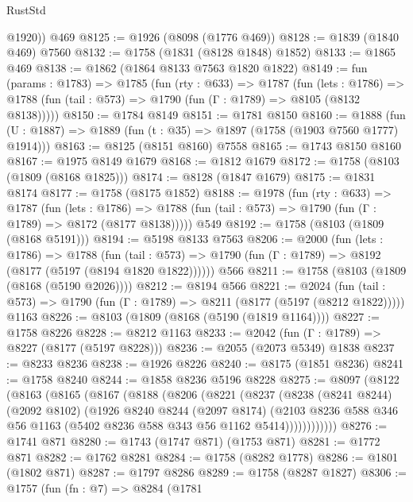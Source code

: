 \begin{lexlean}{RustStd}
\begin{coremodule}
{\begin{coremodule}
{{{{{{{{{{{{{{{        @1920))
    @469
@8125 := @1926 (@8098 (@1776 @469))
@8128 := @1839 (@1840 @469) @7560
@8132 := @1758 (@1831 (@8128 @1848) @1852)
@8133 := @1865 @469
@8138 := @1862 (@1864 @8133 @7563 @1820 @1822)
@8149 := fun (params : @1783) =>
  @1785
    (fun (rty : @633) =>
    @1787
      (fun (lets : @1786) =>
      @1788 (fun (tail : @573) => @1790 (fun (Γ : @1789) => @8105 (@8132 @8138)))))
@8150 := @1784 @8149
@8151 := @1781 @8150
@8160 := @1888 (fun (U : @1887) => @1889 (fun (t : @35) => @1897 (@1758 (@1903 @7560 @1777) @1914)))
@8163 := @8125 (@8151 @8160) @7558
@8165 := @1743 @8150 @8160
@8167 := @1975 @8149 @1679
@8168 := @1812 @1679
@8172 := @1758 (@8103 (@1809 (@8168 @1825)))
@8174 := @8128 (@1847 @1679)
@8175 := @1831 @8174
@8177 := @1758 (@8175 @1852)
@8188 := @1978
    (fun (rty : @633) =>
    @1787
      (fun (lets : @1786) =>
      @1788 (fun (tail : @573) => @1790 (fun (Γ : @1789) => @8172 (@8177 @8138)))))
    @549
@8192 := @1758 (@8103 (@1809 (@8168 @5191)))
@8194 := @5198 @8133 @7563
@8206 := @2000
    (fun (lets : @1786) =>
    @1788
      (fun (tail : @573) => @1790 (fun (Γ : @1789) => @8192 (@8177 (@5197 (@8194 @1820 @1822))))))
    @566
@8211 := @1758 (@8103 (@1809 (@8168 (@5190 @2026))))
@8212 := @8194 @566
@8221 := @2024
    (fun (tail : @573) => @1790 (fun (Γ : @1789) => @8211 (@8177 (@5197 (@8212 @1822)))))
    @1163
@8226 := @8103 (@1809 (@8168 (@5190 (@1819 @1164))))
@8227 := @1758 @8226
@8228 := @8212 @1163
@8233 := @2042 (fun (Γ : @1789) => @8227 (@8177 (@5197 @8228)))
@8236 := @2055 (@2073 @5349) @1838
@8237 := @8233 @8236
@8238 := @1926 @8226
@8240 := @8175 (@1851 @8236)
@8241 := @1758 @8240
@8244 := @1858 @8236 @5196 @8228
@8275 := @8097
    (@8122
      (@8163
        (@8165
          (@8167
            (@8188
              (@8206
                (@8221
                  (@8237
                    (@8238
                      (@8241 @8244)
                      (@2092 @8102)
                      (@1926
                        @8240
                        @8244
                        (@2097 @8174)
                        (@2103
                          @8236
                          @588
                          @346
                          @56
                          @1163
                          (@5402 @8236 @588 @343 @56 @1162 @5414))))))))))))
@8276 := @1741 @871
@8280 := @1743 (@1747 @871) (@1753 @871)
@8281 := @1772 @871
@8282 := @1762 @8281
@8284 := @1758 (@8282 @1778)
@8286 := @1801 (@1802 @871)
@8287 := @1797 @8286
@8289 := @1758 (@8287 @1827)
@8306 := @1757
    (fun (fn : @7) =>
    @8284
      (@1781
}}}}}}}}}}}}}}}
\end{coremodule}}
\end{coremodule}
\end{lexlean}
